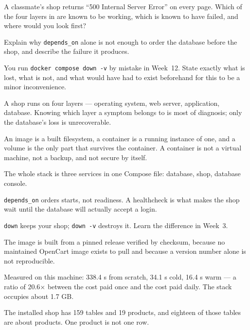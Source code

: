 \begin{checkpoint}
\begin{tightnum}
  \item A classmate's shop returns ``500 Internal Server Error'' on every page.
        Which of the four layers in  are known to be working,
        which is known to have failed, and where would you look first?
  \item Explain why \texttt{depends\_on} alone is not enough to order the
        database before the shop, and describe the failure it produces.
  \item You run \texttt{docker compose down -v} by mistake in Week~12. State
        exactly what is lost, what is not, and what would have had to exist
        beforehand for this to be a minor inconvenience.
\end{tightnum}
\end{checkpoint}

\begin{chaptersummary}
\begin{tight}
  \item A shop runs on four layers --- operating system, web server,
        application, database. Knowing which layer a symptom belongs to is most
        of diagnosis; only the database's loss is unrecoverable.
  \item An image is a built filesystem, a container is a running instance of
        one, and a volume is the only part that survives the container. A
        container is not a virtual machine, not a backup, and not secure by
        itself.
  \item The whole stack is three services in one Compose file: database, shop,
        database console.
  \item \texttt{depends\_on} orders starts, not readiness. A healthcheck is what
        makes the shop wait until the database will actually accept a login.
  \item \texttt{down} keeps your shop; \texttt{down -v} destroys it. Learn the
        difference in Week~3.
  \item The image is built from a pinned release verified by checksum, because
        no maintained OpenCart image exists to pull and because a version
        number alone is not reproducible.
  \item Measured on this machine: 338.4 s from scratch, 34.1 s cold, 16.4 s
        warm --- a ratio of 20.6$\times$ between the cost paid once and the cost
        paid daily. The stack occupies about 1.7 GB.
  \item The installed shop has 159 tables and 19 products, and eighteen of
        those tables are about products. One product is not one row.
\end{tight}
\end{chaptersummary}


